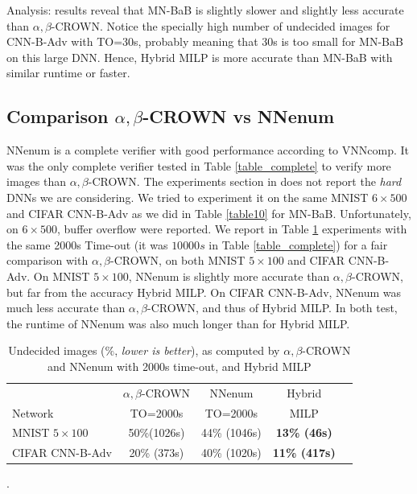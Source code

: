Analysis: results reveal that MN-BaB is slightly slower and slightly less accurate than $\alpha,\beta$-CROWN. Notice the specially high number of undecided images for CNN-B-Adv with TO=30s, probably meaning that 30s is too small for MN-BaB on this large DNN.
Hence, Hybrid MILP is more accurate than MN-BaB with similar runtime or faster.



	\subsection*{Comparison $\alpha,\beta$-CROWN vs NNenum}

NNenum \cite{nnenum} is a complete verifier with good performance according to VNNcomp.
It was the only complete verifier tested in Table \ref{table_complete} to verify more images than $\alpha,\beta$-CROWN. The experiments section in \cite{nnenum} does not report
the {\em hard} DNNs we are considering. We tried to experiment it on the same MNIST 
$6 \times 500$ and CIFAR CNN-B-Adv as we did in Table \ref{table10} for MN-BaB. Unfortunately, on $6 \times 500$, buffer overflow were reported.
We report in Table \ref{table11} experiments with the same 2000s Time-out (it was $10 000s$ in Table \ref{table_complete})  for a fair comparison with $\alpha,\beta$-CROWN, on both 
MNIST $5 \times 100$ and CIFAR CNN-B-Adv. 
On MNIST $5 \times 100$, NNenum is slightly more accurate than $\alpha,\beta$-CROWN, but far from the accuracy Hybrid MILP.
On CIFAR CNN-B-Adv, NNenum was much less accurate than $\alpha,\beta$-CROWN, and thus of Hybrid MILP. In both test, the runtime of NNenum was also much longer than for Hybrid MILP.


\begin{table}[h!]
	\centering
	\begin{tabular}{||l||c||c||c||c||}
		\hline \hline
		 & $\alpha,\beta$-CROWN & NNenum & Hybrid\\ 
		 Network & TO=2000s &  TO=2000s & MILP\\ 
		\hline
		MNIST $5 \times 100$ & 50\%(1026s) & 44\% (1046s) & \bf 13\% (46s)\\ \hline
		CIFAR CNN-B-Adv & 20\% (373s) & 40\% (1020s) & \bf 11\% (417s)\\ \hline 
	\end{tabular}
	\caption{Undecided images ($\%$, {\em lower is better}), as computed by $\alpha,\beta$-CROWN and NNenum with 2000s time-out, and Hybrid MILP}.
	\label{table11}
\end{table}




